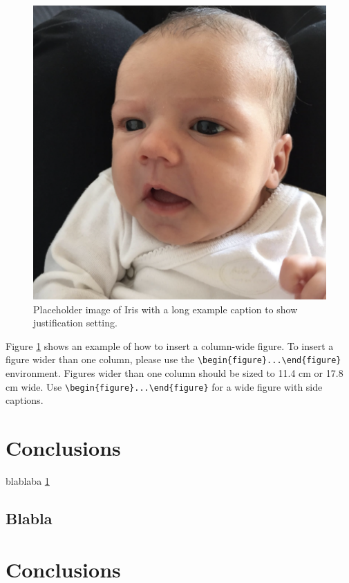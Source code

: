 \documentclass[times, twoside, watermark]{zHenriquesLab-StyleBioRxiv}
\begin{document}
\begin{figure}%
\centering
\includegraphics[width=.8\linewidth]{Figures/Figure_1}
\caption{Placeholder image of Iris with a long example caption to show justification setting.}
\label{fig:computerNo}
\end{figure}

\Blindtext

Figure \ref{fig:computerNo} shows an example of how to insert a column-wide figure. To insert a figure wider than one column, please use the \verb|\begin{figure}...\end{figure}| environment. Figures wider than one column should be sized to 11.4 cm or 17.8 cm wide. Use \verb|\begin{figure}...\end{figure}| for a wide figure with side captions.

\section*{Conclusions}

blablaba \ref{fig:computerNo} 
\blindtext

\subsection*{Blabla} 
\blindtext

\section*{Conclusions}
\end{document}
